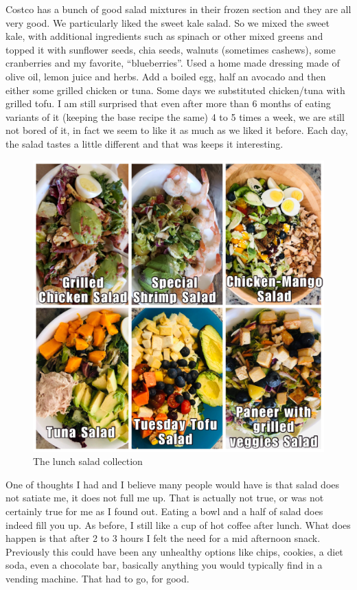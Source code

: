\documentclass[
  oneside]{book}
\begin{document}
Costco has a bunch of good salad mixtures in their frozen section and they are all very good. We particularly liked the sweet kale salad. So we mixed the sweet kale, with additional ingredients such as spinach or other mixed greens and topped it with sunflower seeds, chia seeds, walnuts (sometimes cashews), some cranberries and my favorite, ``blueberries''. Used a home made dressing made of olive oil, lemon juice and herbs. Add a boiled egg, half an avocado and then either some grilled chicken or tuna. Some days we substituted chicken/tuna with grilled tofu. I am still surprised that even after more than 6 months of eating variants of it (keeping the base recipe the same) 4 to 5 times a week, we are still not bored of it, in fact we seem to like it as much as we liked it before. Each day, the salad tastes a little different and that was keeps it interesting.

\begin{figure}
\centering
\includegraphics{pictures/lunch-salads.JPG}
\caption{The lunch salad collection}
\end{figure}

One of thoughts I had and I believe many people would have is that salad does not satiate me, it does not full me up. That is actually not true, or was not certainly true for me as I found out. Eating a bowl and a half of salad does indeed fill you up. As before, I still like a cup of hot coffee after lunch. What does happen is that after 2 to 3 hours I felt the need for a mid afternoon snack. Previously this could have been any unhealthy options like chips, cookies, a diet soda, even a chocolate bar, basically anything you would typically find in a vending machine. That had to go, for good.
\end{document}
